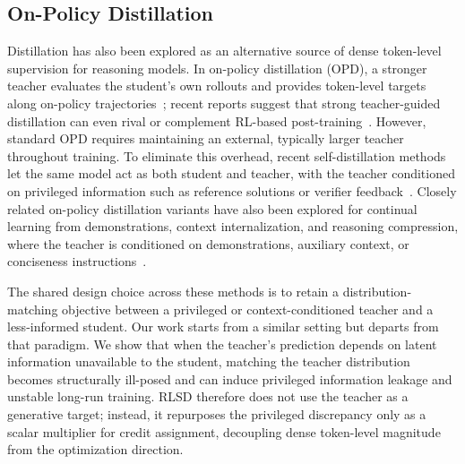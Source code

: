 \subsection{On-Policy Distillation}
Distillation has also been explored as an alternative source of dense token-level supervision for reasoning models. In on-policy distillation (OPD), a stronger teacher evaluates the student's own rollouts and provides token-level targets along on-policy trajectories~\citep{agarwal2024gkd,lu2025onpolicy}; recent reports suggest that strong teacher-guided distillation can even rival or complement RL-based post-training~\citep{mimo2025flash}. However, standard OPD requires maintaining an external, typically larger teacher throughout training. To eliminate this overhead, recent self-distillation methods let the same model act as both student and teacher, with the teacher conditioned on privileged information such as reference solutions or verifier feedback~\citep{zhao2026opsd,hbotter2026reinforcementlearningselfdistillation_sdpo}. Closely related on-policy distillation variants have also been explored for continual learning from demonstrations, context internalization, and reasoning compression, where the teacher is conditioned on demonstrations, auxiliary context, or conciseness instructions~\citep{shenfeld2026selfdistillation,ye2026policy,sang2026policy}.

The shared design choice across these methods is to retain a distribution-matching objective between a privileged or context-conditioned teacher and a less-informed student. Our work starts from a similar setting but departs from that paradigm. We show that when the teacher's prediction depends on latent information unavailable to the student, matching the teacher distribution becomes structurally ill-posed and can induce privileged information leakage and unstable long-run training. RLSD therefore does not use the teacher as a generative target; instead, it repurposes the privileged discrepancy only as a scalar multiplier for credit assignment, decoupling dense token-level magnitude from the optimization direction.
